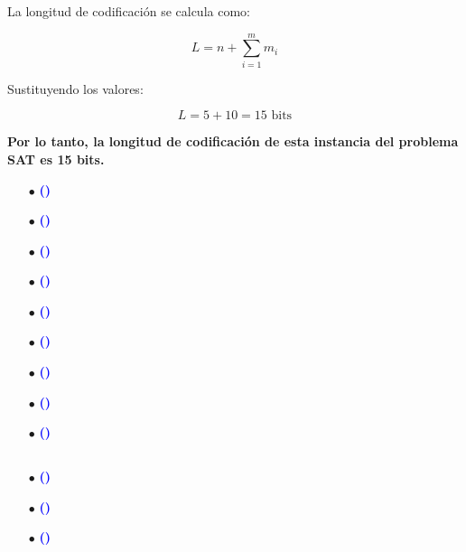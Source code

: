 \documentclass[12pt]{article}
\begin{document}
{{La longitud de codificación se calcula como:

\[
L = n + \sum_{i=1}^{m} m_i
\]

Sustituyendo los valores:

\[
L = 5 + 10 = 15 \text{ bits}
\]

\textbf{Por lo tanto, la longitud de codificación de esta instancia del problema SAT es 15 bits.}


        \begin{enumerate}
            \item[$\bullet$]\textbf{\textcolor{blue}{()}  }{}
            
            \item[$\bullet$]\textbf{\textcolor{blue}{()}  }{}
            
            \item[$\bullet$]\textbf{\textcolor{blue}{()}  }{}
            
            \item[$\bullet$]\textbf{\textcolor{blue}{()}  }{}
            
            \item[$\bullet$]\textbf{\textcolor{blue}{()}  }{}
            
            \item[$\bullet$]\textbf{\textcolor{blue}{()}  }{}
            
            \item[$\bullet$]\textbf{\textcolor{blue}{()}  }{}
            
            \item[$\bullet$]\textbf{\textcolor{blue}{()}  }{}
            
            \item[$\bullet$]\textbf{\textcolor{blue}{()}  }{}
        \end{enumerate}
    }

    \subsection{}
    {
        \begin{enumerate}
            \item[$\bullet$]\textbf{\textcolor{blue}{()}  }{}
            
            \item[$\bullet$]\textbf{\textcolor{blue}{()}  }{}
            
            \item[$\bullet$]\textbf{\textcolor{blue}{()}  }{}
            

\end{enumerate}}}
\end{document}

